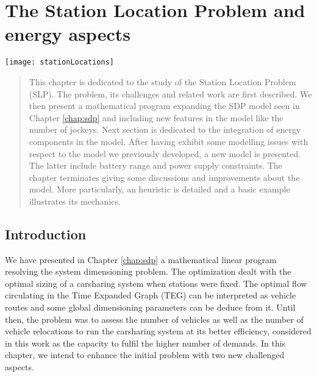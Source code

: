 \chapter{The Station Location Problem and energy aspects} \label{chap:slp}
\begin{bibunit}[ieeetr]
\minitoc
\vspace{2cm}

\noindent
\begin{minipage}[c]{0.25\linewidth}
\flushleft
\texttt{[image: stationLocations]}
\end{minipage}
\hfill
\begin{minipage}[c]{0.8\linewidth}
\begin{abstract}
This chapter is dedicated to the study of the Station Location Problem (SLP).
The problem, its challenges and related work are first described.
We then present a mathematical program expanding the SDP model seen in Chapter \ref{chap:sdp} and including new features in the model like the number of jockeys.
Next section is dedicated to the integration of energy components in the model.
After having exhibit some modelling issues with respect to the model we previously developed, a new model is presented.
The latter include battery range and power supply constraints.
The chapter terminates giving some discussions and improvements about the model.
More particularly, an heuristic is detailed and a basic example illustrates its mechanics.
\end{abstract}
\end{minipage}

\newpage
\section{Introduction}
We have presented in Chapter \ref{chap:sdp} a mathematical linear program resolving the system dimensioning problem.
The optimization dealt with the optimal sizing of a carsharing system when stations were fixed.
The optimal flow circulating in the Time Expanded Graph (TEG) can be interpreted as vehicle routes and some global dimensioning parameters can be deduce from it.
Until then, the problem was to assess the number of vehicles as well as the number of vehicle relocations to run the carsharing system at its better efficiency, considered in this work as the capacity to fulfil the higher number of demands.
In this chapter, we intend to enhance the initial problem with two new challenged aspects.


\end{bibunit}
